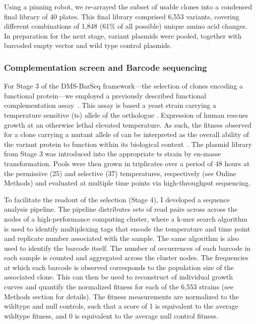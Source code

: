 Using a pinning robot, we re-arrayed the subset of usable clones into a condensed final library of 40 plates. This final library comprised 6,553  variants, covering different combinations of 1,848 (61\% of all possible) unique amino acid changes. In preparation for the next stage, variant plasmids were pooled, together with barcoded empty vector and wild type control plasmids.



\subsubsection{Complementation screen and Barcode sequencing}

For Stage 3 of the DMS-BarSeq framework---the selection of clones encoding a functional protein---we employed a previously described  functional complementation assay~\cite{lee_complementation_1987,osborn_rescuing_2007}. This assay is based a yeast strain carrying a temperature sensitive (ts) allele of the  orthologue . Expression of human  rescues growth at an otherwise lethal elevated temperature. As such, the fitness observed for a clone carrying a mutant allele of  can be interpreted as the overall ability of the variant protein to function within its biological context~\cite{sun_extended_2016}. 
The plasmid library from Stage 3 was introduced into the appropriate ts strain by en-masse transformation. Pools were then grown in triplicates over a period of 48 hours at the permissive (25\celsius ) and selective (37\celsius ) temperatures, respectively (see Online Methods) and evaluated at multiple time points via high-throughput sequencing.

To facilitate the readout of the selection (Stage 4), I developed a sequence analysis pipeline. The pipeline distributes sets of read pairs across across the nodes of a high-performance computing cluster, where a k-mer search algorithm is used to identify multiplexing tags that encode the temperature and time point and replicate number associated with the sample. The same algorithm is also used to identify the barcode itself. The number of occurrences of each barcode in each sample is counted and aggregated across the cluster nodes. The frequencies at which each barcode is observed corresponds to the population size of the associated clone. This can then be used to reconstruct of individual growth curves and quantify the normalized fitness for each of the 6,553 strains (see Methods section for details). The fitness measurements are normalized to the wildtype and null controls, such that a score of 1 is equivalent to the average wildtype fitness, and 0 is equivalent to the average null control fitness.

